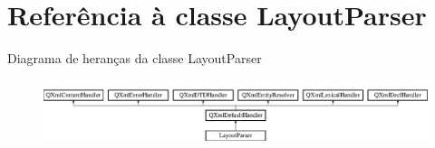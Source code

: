 \hypertarget{class_layout_parser}{\section{Referência à classe Layout\-Parser}
\label{class_layout_parser}
}
Diagrama de heranças da classe Layout\-Parser\begin{figure}[H]
\begin{center}
\leavevmode
\includegraphics[height=2.014389cm]{class_layout_parser}
\end{center}
\end{figure}
